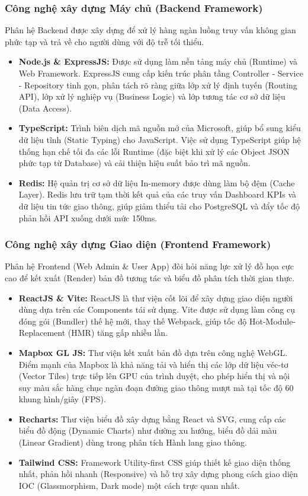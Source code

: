 \subsubsection{Công nghệ xây dựng Máy chủ (Backend Framework)}

Phân hệ Backend được xây dựng để xử lý hàng ngàn luồng truy vấn không gian phức tạp và trả về cho người dùng với độ trễ tối thiểu.
\begin{itemize}
    \item \textbf{Node.js \& ExpressJS:} Được sử dụng làm nền tảng máy chủ (Runtime) và Web Framework. ExpressJS cung cấp kiến trúc phân tầng Controller - Service - Repository tinh gọn, phân tách rõ ràng giữa lớp xử lý định tuyến (Routing API), lớp xử lý nghiệp vụ (Business Logic) và lớp tương tác cơ sở dữ liệu (Data Access).
    \item \textbf{TypeScript:} Trình biên dịch mã nguồn mở của Microsoft, giúp bổ sung kiểu dữ liệu tĩnh (Static Typing) cho JavaScript. Việc sử dụng TypeScript giúp hệ thống hạn chế tối đa các lỗi Runtime (đặc biệt khi xử lý các Object JSON phức tạp từ Database) và cải thiện hiệu suất bảo trì mã nguồn.
    \item \textbf{Redis:} Hệ quản trị cơ sở dữ liệu In-memory được dùng làm bộ đệm (Cache Layer). Redis lưu trữ tạm thời kết quả của các truy vấn Dashboard KPIs và dữ liệu tin tức giao thông, giúp giảm thiểu tải cho PostgreSQL và đẩy tốc độ phản hồi API xuống dưới mức 150ms.
\end{itemize}

\subsubsection{Công nghệ xây dựng Giao diện (Frontend Framework)}

Phân hệ Frontend (Web Admin \& User App) đòi hỏi năng lực xử lý đồ họa cực cao để kết xuất (Render) bản đồ tương tác và biểu đồ phân tích thời gian thực.
\begin{itemize}
    \item \textbf{ReactJS \& Vite:} ReactJS là thư viện cốt lõi để xây dựng giao diện người dùng dựa trên các Components tái sử dụng. Vite được sử dụng làm công cụ đóng gói (Bundler) thế hệ mới, thay thế Webpack, giúp tốc độ Hot-Module-Replacement (HMR) tăng gấp nhiều lần.
    \item \textbf{Mapbox GL JS:} Thư viện kết xuất bản đồ dựa trên công nghệ WebGL. Điểm mạnh của Mapbox là khả năng tải và hiển thị các lớp dữ liệu véc-tơ (Vector Tiles) trực tiếp lên GPU của trình duyệt, cho phép hiển thị và nội suy màu sắc hàng chục ngàn đoạn đường giao thông mượt mà tại tốc độ 60 khung hình/giây (FPS).
    \item \textbf{Recharts:} Thư viện biểu đồ xây dựng bằng React và SVG, cung cấp các biểu đồ động (Dynamic Charts) như đường xu hướng, biểu đồ dải màu (Linear Gradient) dùng trong phân tích Hành lang giao thông.
    \item \textbf{Tailwind CSS:} Framework Utility-first CSS giúp thiết kế giao diện thống nhất, phản hồi nhanh (Responsive) và hỗ trợ xây dựng phong cách giao diện IOC (Glassmorphism, Dark mode) một cách trực quan nhất.
\end{itemize}

